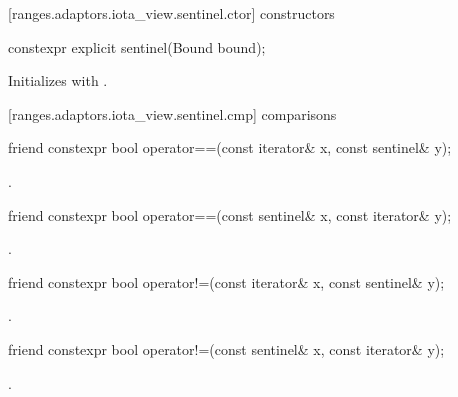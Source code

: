 [ranges.adaptors.iota_view.sentinel.ctor]{ constructors}

\begin{itemdecl}
constexpr explicit sentinel(Bound bound);
\end{itemdecl}

\begin{itemdescr}
\pnum
\effects Initializes  with .
\end{itemdescr}

[ranges.adaptors.iota_view.sentinel.cmp]{ comparisons}

\begin{itemdecl}
friend constexpr bool operator==(const iterator& x, const sentinel& y);
\end{itemdecl}

\begin{itemdescr}
\pnum
\returns {}.
\end{itemdescr}

\begin{itemdecl}
friend constexpr bool operator==(const sentinel& x, const iterator& y);
\end{itemdecl}

\begin{itemdescr}
\pnum
\returns {}.
\end{itemdescr}

\begin{itemdecl}
friend constexpr bool operator!=(const iterator& x, const sentinel& y);
\end{itemdecl}

\begin{itemdescr}
\pnum
\returns {}.
\end{itemdescr}

\begin{itemdecl}
friend constexpr bool operator!=(const sentinel& x, const iterator& y);
\end{itemdecl}

\begin{itemdescr}
\pnum
\returns {}.
\end{itemdescr}

